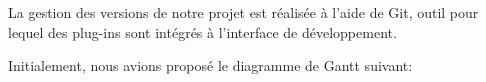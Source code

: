 La gestion des versions de notre projet est réalisée à l’aide de Git, outil pour lequel des plug-ins sont intégrés à l’interface de développement.

\newpage
Initialement, nous avions proposé le diagramme de Gantt suivant:
\begin{figure*}[h!]
	
\end{figure*}